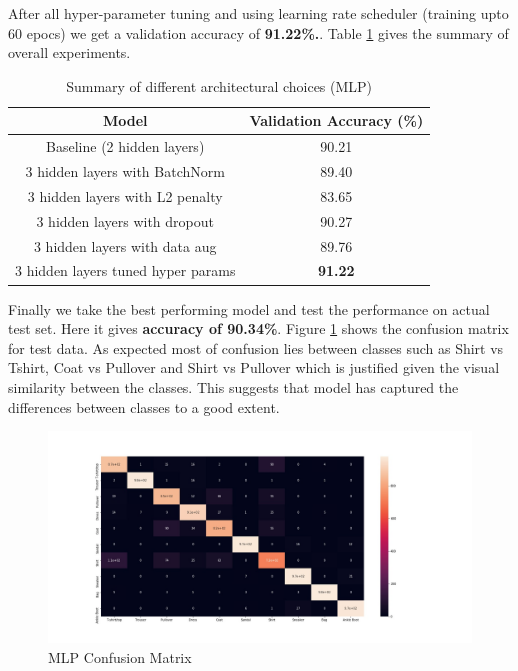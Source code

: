 \documentclass[10pt,a4paper]{article}
\begin{document}
After all hyper-parameter tuning and using learning rate scheduler (training upto 60 epocs) we get a validation accuracy of \textbf{91.22\%.}. Table \ref{table:1} gives the summary of overall experiments.

\begin{table}[h!]
\centering
\begin{tabular}{|c| c|} 
 \hline
 Model & Validation Accuracy (\%) \\
 \hline\hline
 Baseline (2 hidden layers) & 90.21 \\ 
 \hline
 3 hidden layers with BatchNorm & 89.40 \\ 
 \hline
 3 hidden layers with L2 penalty & 83.65 \\ 
 \hline
 3 hidden layers with dropout & 90.27 \\ 
 \hline
 3 hidden layers with data aug & 89.76 \\ 
 \hline
 3 hidden layers tuned hyper params & \textbf{91.22} \\ 
 \hline
\end{tabular}
\caption{Summary of different architectural choices (MLP) }
\label{table:1}
\end{table}

Finally we take the best performing model and test the performance on actual test set. Here it gives \textbf{accuracy of 90.34\%}. Figure \ref{mlpcm} shows the confusion matrix for test data. As expected most of confusion lies between classes such as Shirt vs Tshirt, Coat vs Pullover and Shirt vs Pullover which is justified given the visual similarity between the classes. This suggests that model has captured the differences between classes to a good extent.

\begin{figure}[h!]
	\includegraphics[width=1.3\linewidth]{cm_mlp.jpg}
	\caption{MLP Confusion Matrix}
	\label{mlpcm}
\end{figure}
\end{document}
